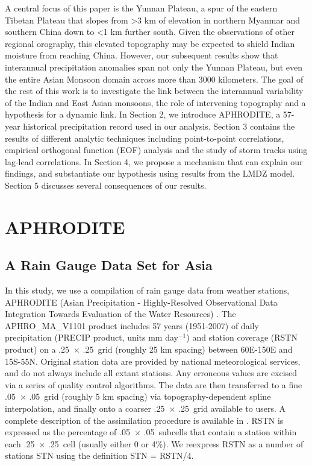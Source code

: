 \documentclass[12pt]{article}
\begin{document}
	A central focus of this paper is the Yunnan Plateau, a spur of the eastern Tibetan Plateau that slopes from \textgreater3 km of elevation in northern Myanmar and southern China down to \textless1 km further south. Given the observations of other regional orography, this elevated topography may be expected to shield Indian moisture from reaching China. However, our subsequent results show that interannual precipitation anomalies span not only the Yunnan Plateau, but even the entire Asian Monsoon domain across more than 3000 kilometers. The goal of the rest of this work is to investigate the link between the interannual variability of the Indian and East Asian monsoons, the role of intervening topography and a hypothesis for a dynamic link. In Section 2, we introduce APHRODITE, a 57-year historical precipitation record used in our analysis. Section 3 contains the results of different analytic techniques including point-to-point correlations, empirical orthogonal function (EOF) analysis and the study of storm tracks using lag-lead correlations. In Section 4, we propose a mechanism that can explain our findings, and substantiate our hypothesis using results from the LMDZ model. Section 5 discusses several consequences of our results.
	
\section{APHRODITE}

\subsection{A Rain Gauge Data Set for Asia}

	In this study, we use a compilation of rain gauge data from weather stations, APHRODITE (Asian Precipitation - Highly-Resolved Observational Data Integration Towards Evaluation of the Water Resources) \citep{Yatagai2012}. The APHRO\_MA\_V1101 product includes 57 years (1951-2007) of daily precipitation (PRECIP product, units mm day$^{-1}$) and station coverage (RSTN product) on a .25\textdegree\ $\times$ .25\textdegree\ grid (roughly 25 km spacing) between 60\textdegree E-150\textdegree E and 15\textdegree S-55\textdegree N. Original station data are provided by national meteorological services, and do not always include all extant stations. Any erroneous values are excised via a series of quality control algorithms. The data are then transferred to a fine .05\textdegree\ $\times$ .05\textdegree\ grid (roughly 5 km spacing) via topography-dependent spline interpolation, and finally onto a coarser .25\textdegree\ $\times$ .25\textdegree\ grid available to users. A complete description of the assimilation procedure is available in  \cite{Yatagai2012}. RSTN is expressed as the percentage of .05\textdegree\ $\times$ .05\textdegree\ subcells that contain a station within each .25\textdegree\ $\times$ .25\textdegree\ cell (usually either 0 or 4\%). We reexpress RSTN as a number of stations STN using the definition STN = RSTN/4. 
	
\end{document}
